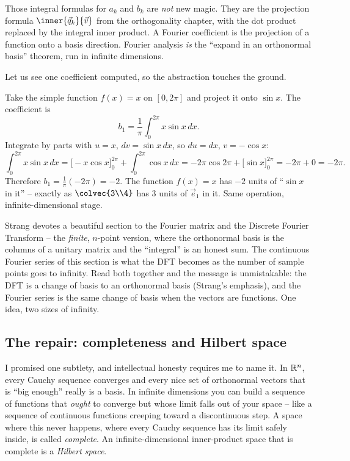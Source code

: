 \begin{focusbox}
Those integral formulas for $a_k$ and $b_k$ are \emph{not} new magic. They are the
projection formula $\inner{\vec{q}_k}{\vec{v}}$ from the orthogonality chapter, with
the dot product replaced by the integral inner product. A Fourier coefficient is the
projection of a function onto a basis direction. Fourier analysis \emph{is} the
``expand in an orthonormal basis'' theorem, run in infinite dimensions.
\end{focusbox}

Let us see one coefficient computed, so the abstraction touches the ground.

\begin{example}
\label{ch37:ex-fourier}
Take the simple function $f(x)=x$ on $[0,2\pi]$ and project it onto $\sin x$. The
coefficient is
\[
  b_1 = \frac{1}{\pi}\int_0^{2\pi} x\sin x\,dx.
\]
Integrate by parts with $u=x$, $dv=\sin x\,dx$, so $du=dx$, $v=-\cos x$:
\[
  \int_0^{2\pi} x\sin x\,dx
  = \big[-x\cos x\big]_0^{2\pi} + \int_0^{2\pi}\cos x\,dx
  = -2\pi\cos 2\pi + \big[\sin x\big]_0^{2\pi}
  = -2\pi + 0 = -2\pi.
\]
Therefore $b_1 = \frac{1}{\pi}(-2\pi) = -2$. The function $f(x)=x$ has $-2$ units of
``$\sin x$ in it'' -- exactly as $\colvec{3\\4}$ has $3$ units of $\vec{e}_1$ in it.
Same operation, infinite-dimensional stage.
\end{example}

\begin{strangbox}
Strang devotes a beautiful section to the Fourier matrix and the Discrete Fourier
Transform -- the \emph{finite}, $n$-point version, where the orthonormal basis is the
columns of a unitary matrix and the ``integral'' is an honest sum. The continuous
Fourier series of this section is what the DFT becomes as the number of sample
points goes to infinity. Read both together and the message is unmistakable: the DFT
is a change of basis to an orthonormal basis (Strang's emphasis), and the Fourier
series is the same change of basis when the vectors are functions. One idea, two
sizes of infinity.
\end{strangbox}

\subsection{The repair: completeness and Hilbert space}
\label{ch37:hilbert}

I promised one subtlety, and intellectual honesty requires me to name it. In $\mathbb{R}^n$,
every Cauchy sequence converges and every nice set of orthonormal vectors that is
``big enough'' really is a basis. In infinite dimensions you can build a sequence of
functions that \emph{ought} to converge but whose limit falls out of your space --
like a sequence of continuous functions creeping toward a discontinuous step. A
space where this never happens, where every Cauchy sequence has its limit safely
inside, is called \emph{complete}. An infinite-dimensional inner-product space that
is complete is a \emph{Hilbert space}.

